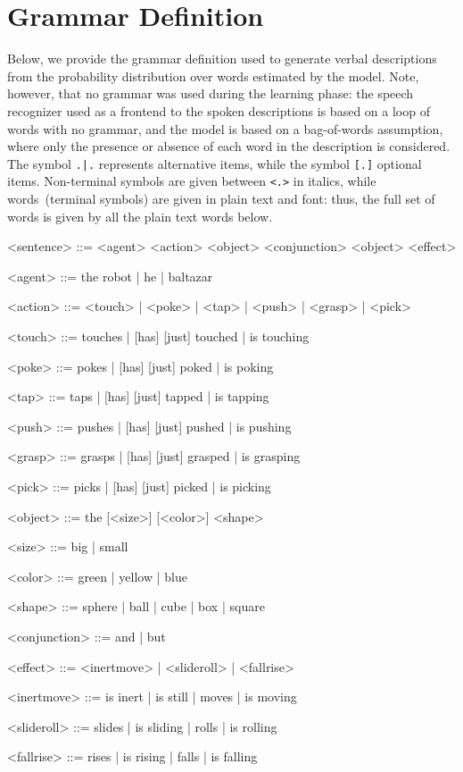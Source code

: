 
\section{Grammar Definition}
\label{appendix:grammar}
Below, we provide the grammar definition used to generate verbal descriptions from the probability distribution over words estimated by the model.
Note, however, that no grammar was used during the learning phase: the speech recognizer used as a frontend to the spoken descriptions is based on a loop of words with no grammar, and the \AffWords{} model is based on a bag-of-words assumption, where only the presence or absence of each word in the description is considered.
The symbol \texttt{.|.} represents alternative items, while the symbol \texttt{[.]} optional items.
Non-terminal symbols are given between \texttt{<.>} in italics, while words~(terminal symbols) are given in plain text and font: thus, the full set of words is given by all the plain text words below.

\begin{grammar}
  <sentence> ::= <agent> <action> <object> <conjunction> <object> <effect>

  <agent> ::= the robot | he | baltazar

  <action> ::= <touch> | <poke> | <tap> | <push> | <grasp> | <pick>

  <touch> ::= touches | [has] [just] touched | is touching

  <poke> ::= pokes | [has] [just] poked | is poking

  <tap> ::= taps | [has] [just] tapped | is tapping

  <push> ::= pushes | [has] [just] pushed | is pushing

  <grasp> ::= grasps | [has] [just] grasped | is grasping

  <pick> ::= picks | [has] [just] picked | is picking

  <object> ::= the [<size>] [<color>] <shape>

  <size> ::= big | small

  <color> ::= green | yellow | blue

  <shape> ::= sphere | ball | cube | box | square

  <conjunction> ::= and | but

  <effect> ::= <inertmove> | <slideroll> | <fallrise>

  <inertmove> ::= is inert | is still | moves | is moving

  <slideroll> ::= slides | is sliding | rolls | is rolling

  <fallrise> ::= rises | is rising | falls | is falling
\end{grammar}
